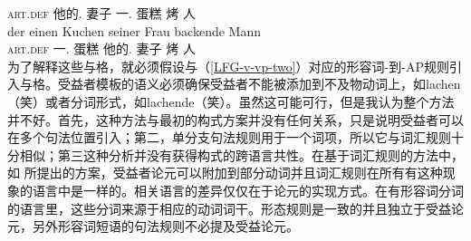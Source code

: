      \textsc{art}.\textsc{def} 他的.\dat{} 妻子 一.\acc{} 蛋糕 烤 人\\
\ex
\gll der einen Kuchen seiner Frau backende Mann\\
     \textsc{art}.\textsc{def} 一.\acc{} 蛋糕  他的.\dat{} 妻子 烤 人\\
\zl
为了解释这些与格，就必须假设与（\ref{LFG-v-vp-two}）对应的形容词-到-AP规则引入与格。受益者模板的语义必须确保受益者不能被添加到不及物动词上，如lachen（笑）或者分词形式，如lachende（笑）。虽然这可能可行，但是我认为整个方法并不好。首先，这种方法与最初的构式方案并没有任何关系，只是说明受益者可以在多个句法位置引入；第二，单分支句法规则用于一个词项，所以它与词汇规则十分相似；第三这种分析并没有获得构式的跨语言共性。在基于词汇规则的方法中，如 \citet[\S~5]{BC99a}所提出的方案，受益者论元可以附加到部分动词并且词汇规则在所有有这种现象的语言中是一样的。相关语言的差异仅仅在于论元的实现方式。在有形容词分词的语言里，这些分词来源于相应的动词词干。形态规则是一致的并且独立于受益论元，另外形容词短语的句法规则不必提及受益论元。

